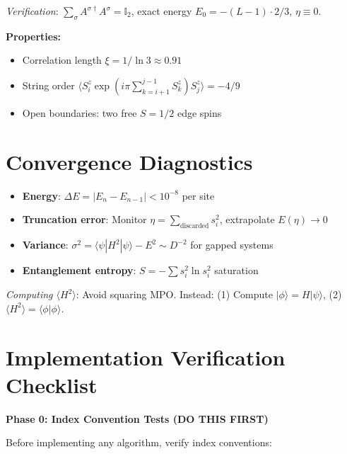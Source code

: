 \documentclass[aps,prb,onecolumn,scriptaddress]{revtex4-2}
\newcommand{\ket}[1]{|#1\rangle}
\newcommand{\bra}[1]{\langle#1|}
\newcommand{\braket}[2]{\langle#1|#2\rangle}
\begin{document}
	\textit{Verification}: $\sum_{\sigma} A^{\sigma\dagger} A^{\sigma} = \mathbb{I}_2$, exact energy $E_0 = -(L-1) \cdot 2/3$, $\eta \equiv 0$.
	
	\textbf{Properties:}
	\begin{itemize}
		\item Correlation length $\xi = 1/\ln 3 \approx 0.91$
		\item String order $\langle S^z_i \exp(i\pi \sum_{k=i+1}^{j-1} S^z_k) S^z_j \rangle = -4/9$
		\item Open boundaries: two free $S=1/2$ edge spins
	\end{itemize}
	
	\section{Convergence Diagnostics}
	
	\begin{itemize}
		\item \textbf{Energy}: $\Delta E = |E_{n} - E_{n-1}| < 10^{-8}$ per site
		\item \textbf{Truncation error}: Monitor $\eta = \sum_{\text{discarded}} s_i^2$, extrapolate $E(\eta) \to 0$
		\item \textbf{Variance}: $\sigma^2 = \bra{\psi}H^2\ket{\psi} - E^2 \sim D^{-2}$ for gapped systems
		\item \textbf{Entanglement entropy}: $S = -\sum s_i^2 \ln s_i^2$ saturation
	\end{itemize}
	
	\textit{Computing $\langle H^2 \rangle$}: Avoid squaring MPO. Instead: (1) Compute $\ket{\phi} = H\ket{\psi}$, (2) $\langle H^2 \rangle = \braket{\phi}{\phi}$.
	
	\section{Implementation Verification Checklist}
	\label{sec:verification}
	
	\textbf{Phase 0: Index Convention Tests (DO THIS FIRST)}
	
	Before implementing any algorithm, verify index conventions:
	
\end{document}
